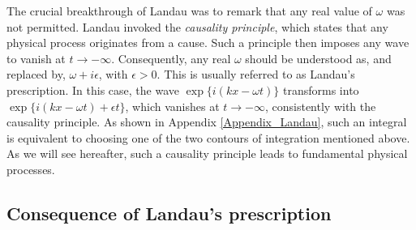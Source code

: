 \documentclass[11pt]{article}
\begin{document}
The crucial breakthrough of Landau was to remark that any real value of $\omega$ was not permitted. Landau invoked the \emph{causality principle}, which states that any physical process originates from a cause. Such a principle then imposes any wave to vanish at $t\to-\infty$. Consequently, any real $\omega$ should be understood as, and replaced by, $\omega + i\epsilon$, with $\epsilon>0$. This is usually referred to as Landau's prescription. In this case, the wave $\exp \{i(kx- \omega t)\}$ transforms into $\exp \{i(kx- \omega t)+\epsilon t\}$, which vanishes at $t\rightarrow -\infty$, consistently with the causality principle. As shown in Appendix \ref{Appendix_Landau}, such an integral is equivalent to choosing one of the two contours of integration mentioned above. As we will see hereafter, such a causality principle leads to fundamental physical processes.

\subsection{Consequence of Landau's prescription}
\label{ss_analytic_contin}
\end{document}
